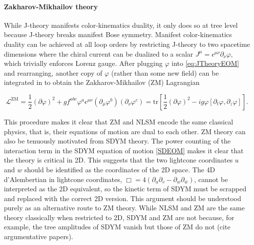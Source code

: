 \documentclass[11pt,letter]{article}
\def\be{\begin{equation}}
\def\ee{\end{equation}}
\begin{document}
\paragraph{Zakharov-Mikhailov theory}
\label{sec:ZMTheory}
While J-theory manifests color-kinematics duality, it only does so at tree level because J-theory breaks manifest Bose symmetry.
Manifest color-kinematics duality can be achieved at all loop orders by restricting J-theory to two spacetime dimensions where the chiral current can be dualized to a scalar $J^\mu = \epsilon^{\mu\nu} \partial_\nu \varphi$, which trivially enforces Lorenz gauge.
After plugging $\varphi$ into \cref{eq:JTheoryEOM} and rearranging, another copy of $\varphi$ (rather than some new field) can be integrated in to obtain the Zakharov-Mikhailov (ZM) Lagrangian
\begin{eBox}
\be
\label{eq:ZMLagrangian}
\mathcal{L}^{\text{ZM}} = \frac{1}{2}(\partial \varphi)^2 + g f^{abc} \varphi^a \epsilon^{\mu\nu}(\partial_\mu \varphi^b)( \partial_\nu \varphi^c) =  \text{tr}\left[\frac{1}{2}(\partial \varphi)^2-i g \varphi [\partial_t \varphi, \partial_z \varphi ]\right] .
\ee
\end{eBox}
This procedure makes it clear that ZM and NLSM encode the same classical physics, that is, their equations of motion are dual to each other.
ZM theory can also be tenuously motivated from SDYM theory.
The power counting of the interaction term in the SDYM equation of motion \cref{SDEOM} makes it clear that the theory is critical in 2D.
This suggests that the two lightcone coordinates $u$ and $w$ should be identified as the coordinates of the 2D space.
The 4D d'Alembertian in lightcone coordinates, $\Box = 4 (\partial_u \partial_v - \partial_w \partial_{\bar{w}})$, cannot be interpreted as the 2D equivalent, so the kinetic term of SDYM must be scrapped and replaced with the correct 2D version.
This argument should be understood purely as an alternative route to ZM theory.
While NLSM and ZM are the same theory classically when restricted to 2D, SDYM and ZM are not because, for example, the tree amplitudes of SDYM vanish but those of ZM do not (cite argumentative papers).
\end{document}

